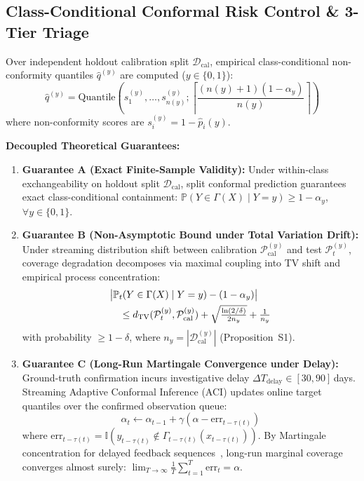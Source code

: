 \subsection{Class-Conditional Conformal Risk Control \& 3-Tier Triage}
\label{sec:conformal_triage}
Over independent holdout calibration split $\mathcal{D}_{\text{cal}}$, empirical class-conditional non-conformity quantiles $\hat{q}^{(y)}$ are computed ($y \in \{0, 1\}$):
\begin{equation}
\hat{q}^{(y)} = \text{Quantile}\left( s_1^{(y)}, \dots, s_{n(y)}^{(y)} ; \left\lceil \frac{(n(y) + 1)(1 - \alpha_y)}{n(y)} \right\rceil \right)
\label{eq:conformal_quantile}
\end{equation}
where non-conformity scores are $s_i^{(y)} = 1 - \hat{p}_i(y)$.

\textbf{Decoupled Theoretical Guarantees:}
\begin{enumerate}[leftmargin=*]
    \item \textbf{Guarantee A (Exact Finite-Sample Validity):} Under within-class exchangeability on holdout split $\mathcal{D}_{\text{cal}}$, split conformal prediction guarantees exact class-conditional containment: $\mathbb{P}(Y \in \Gamma(X) \mid Y = y) \ge 1 - \alpha_y$, $\forall y \in \{0, 1\}$.
    \item \textbf{Guarantee B (Non-Asymptotic Bound under Total Variation Drift):} Under streaming distribution shift between calibration $\mathcal{P}_{\text{cal}}^{(y)}$ and test $\mathcal{P}_t^{(y)}$, coverage degradation decomposes via maximal coupling into TV shift and empirical process concentration:
    \begin{align}
    &\big| \mathbb{P}_{t}(Y \in \Gamma(X) \mid Y=y) - (1 - \alpha_y) \big| \notag \\
    &\quad \le d_{\mathrm{TV}}(\mathcal{P}_t^{(y)}, \mathcal{P}_{\text{cal}}^{(y)}) + \sqrt{\tfrac{\ln(2/\delta)}{2 n_y}} + \tfrac{1}{n_y}
    \end{align}
    with probability $\ge 1 - \delta$, where $n_y = |\mathcal{D}_{\text{cal}}^{(y)}|$ (Proposition~S1).
    \item \textbf{Guarantee C (Long-Run Martingale Convergence under Delay):} Ground-truth confirmation incurs investigative delay $\Delta T_{\text{delay}} \in [30, 90]$\,days. Streaming Adaptive Conformal Inference (ACI) updates online target quantiles over the confirmed observation queue:
    \begin{equation}
    \alpha_t \leftarrow \alpha_{t-1} + \gamma (\alpha - \text{err}_{t - \tau(t)})
    \end{equation}
    where $\text{err}_{t - \tau(t)} = \mathbb{I}(y_{t - \tau(t)} \notin \Gamma_{t - \tau(t)}(x_{t - \tau(t)}))$. By Martingale concentration for delayed feedback sequences~\cite{gibbs2021adaptive}, long-run marginal coverage converges almost surely: $\lim_{T \to \infty} \frac{1}{T} \sum_{t=1}^T \text{err}_t = \alpha$.
\end{enumerate}

